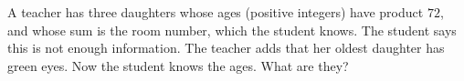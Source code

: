 A teacher has three daughters whose ages (positive integers) have product $72$, and whose sum is the room number, which the student knows. The student says this is not enough information. The teacher adds that her oldest daughter has green eyes. Now the student knows the ages. What are they?
